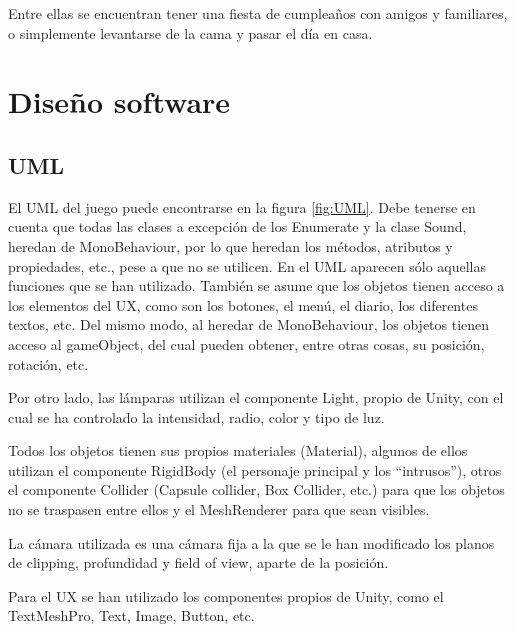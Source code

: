 \documentclass[12pt, a4paper,twoside,titlepage]{book}
\begin{document}
Entre ellas se encuentran tener una fiesta de cumpleaños con amigos y familiares, o simplemente levantarse de la cama y pasar el día en casa. 

\section{Diseño software}

\subsection{UML}

El UML del juego puede encontrarse en la figura \ref{fig:UML}. Debe tenerse en cuenta que todas las clases a excepción de los Enumerate y la clase Sound, heredan de MonoBehaviour, por lo que heredan los métodos, atributos y propiedades, etc., pese a que no se utilicen. En el UML aparecen sólo aquellas funciones que se han utilizado. También se asume que los objetos tienen acceso a los elementos del UX, como son los botones, el menú, el diario, los diferentes textos, etc. Del mismo modo, al heredar de MonoBehaviour, los objetos tienen acceso al gameObject, del cual pueden obtener, entre otras cosas, su posición, rotación, etc. 

Por otro lado, las lámparas utilizan el componente Light, propio de Unity, con el cual se ha controlado la intensidad, radio, color y tipo de luz. 

Todos los objetos tienen sus propios materiales (Material), algunos de ellos utilizan el componente RigidBody (el personaje principal y los ``intrusos''), otros el componente Collider (Capsule collider, Box Collider, etc.) para que los objetos no se traspasen entre ellos y el MeshRenderer para que sean visibles.

La cámara utilizada es una cámara fija a la que se le han modificado los planos de clipping, profundidad y field of view, aparte de la posición. 

Para el UX se han utilizado los componentes propios de Unity, como el TextMeshPro, Text, Image, Button, etc. 
\end{document}
